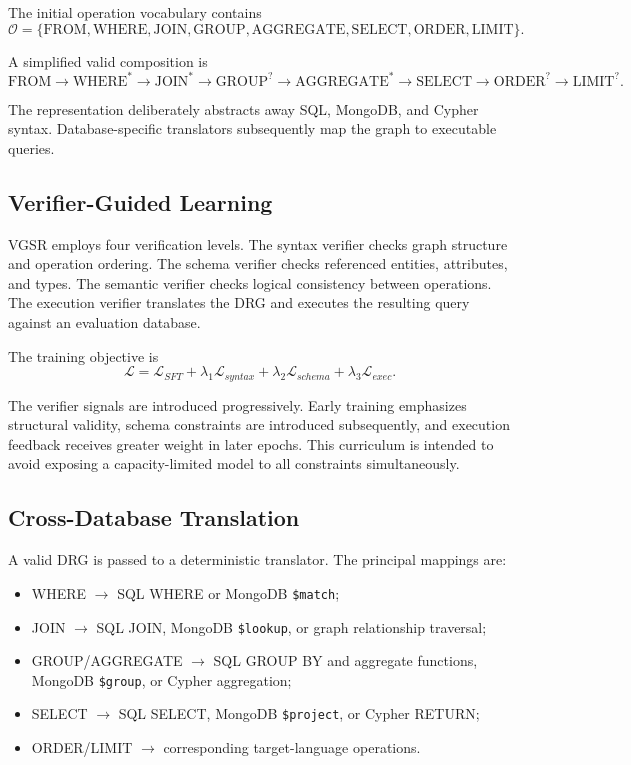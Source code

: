 \documentclass[conference]{IEEEtran}
\begin{document}
The initial operation vocabulary contains
\begin{equation}
\mathcal{O}=\{
\mathrm{FROM},\mathrm{WHERE},\mathrm{JOIN},\mathrm{GROUP},
\mathrm{AGGREGATE},\mathrm{SELECT},\mathrm{ORDER},\mathrm{LIMIT}
\}.
\end{equation}

A simplified valid composition is
\begin{equation}
\mathrm{FROM}\rightarrow\mathrm{WHERE}^{*}\rightarrow
\mathrm{JOIN}^{*}\rightarrow\mathrm{GROUP}^{?}\rightarrow
\mathrm{AGGREGATE}^{*}\rightarrow\mathrm{SELECT}\rightarrow
\mathrm{ORDER}^{?}\rightarrow\mathrm{LIMIT}^{?}.
\end{equation}

The representation deliberately abstracts away SQL, MongoDB, and Cypher syntax. Database-specific translators subsequently map the graph to executable queries.

\subsection{Verifier-Guided Learning}
VGSR employs four verification levels. The syntax verifier checks graph structure and operation ordering. The schema verifier checks referenced entities, attributes, and types. The semantic verifier checks logical consistency between operations. The execution verifier translates the DRG and executes the resulting query against an evaluation database.

The training objective is
\begin{equation}
\mathcal{L}=
\mathcal{L}_{SFT}+
\lambda_1\mathcal{L}_{syntax}+
\lambda_2\mathcal{L}_{schema}+
\lambda_3\mathcal{L}_{exec}.
\end{equation}

The verifier signals are introduced progressively. Early training emphasizes structural validity, schema constraints are introduced subsequently, and execution feedback receives greater weight in later epochs. This curriculum is intended to avoid exposing a capacity-limited model to all constraints simultaneously.

\subsection{Cross-Database Translation}
A valid DRG is passed to a deterministic translator. The principal mappings are:
\begin{itemize}
\item WHERE $\rightarrow$ SQL WHERE or MongoDB \texttt{\$match};
\item JOIN $\rightarrow$ SQL JOIN, MongoDB \texttt{\$lookup}, or graph relationship traversal;
\item GROUP/AGGREGATE $\rightarrow$ SQL GROUP BY and aggregate functions, MongoDB \texttt{\$group}, or Cypher aggregation;
\item SELECT $\rightarrow$ SQL SELECT, MongoDB \texttt{\$project}, or Cypher RETURN;
\item ORDER/LIMIT $\rightarrow$ corresponding target-language operations.
\end{itemize}
\end{document}

